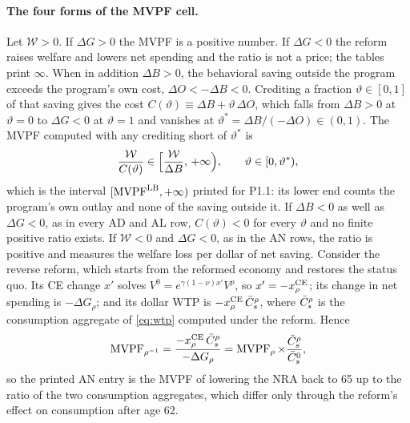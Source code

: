 \paragraph{The four forms of the MVPF cell.}
Let $\mathcal{W}>0$. If $\Delta G>0$ the MVPF is a positive number. If $\Delta G<0$ the reform raises welfare and lowers net spending and the ratio is not a price; the tables print $\infty$. When in addition $\Delta B>0$, the behavioral saving outside the program exceeds the program's own cost, $\Delta O<-\Delta B<0$. Crediting a fraction $\vartheta\in[0,1]$ of that saving gives the cost $C(\vartheta)\equiv\Delta B+\vartheta\,\Delta O$, which falls from $\Delta B>0$ at $\vartheta=0$ to $\Delta G<0$ at $\vartheta=1$ and vanishes at $\vartheta^{*}=\Delta B/(-\Delta O)\in(0,1)$. The MVPF computed with any crediting short of $\vartheta^{*}$ is
\begin{equation}\label{eq:app-lbset}
\frac{\mathcal{W}}{C(\vartheta)}\in\Bigl[\frac{\mathcal{W}}{\Delta B},\,+\infty\Bigr),\qquad \vartheta\in[0,\vartheta^{*}),
\end{equation}
which is the interval $[\operatorname{MVPF}^{\mathrm{LB}},+\infty)$ printed for P1.1: its lower end counts the program's own outlay and none of the saving outside it. If $\Delta B<0$ as well as $\Delta G<0$, as in every AD and AL row, $C(\vartheta)<0$ for every $\vartheta$ and no finite positive ratio exists.
If $\mathcal{W}<0$ and $\Delta G<0$, as in the AN rows, the ratio is positive and measures the welfare loss per dollar of net saving. Consider the reverse reform, which starts from the reformed economy and restores the status quo. Its CE change $x'$ solves $V^{0}=e^{\gamma(1-\nu)x'}V^{\rho}$, so $x'=-x^{\mathrm{CE}}_{\rho}$; its change in net spending is $-\Delta G_{\rho}$; and its dollar WTP is $-x^{\mathrm{CE}}_{\rho}\,\bar{C}_{s}^{\rho}$, where $\bar{C}_{s}^{\rho}$ is the consumption aggregate of \eqref{eq:wtp} computed under the reform. Hence
\begin{equation}\label{eq:app-reverse}
\operatorname{MVPF}_{\rho^{-1}}=\frac{-x^{\mathrm{CE}}_{\rho}\,\bar{C}_{s}^{\rho}}{-\Delta G_{\rho}}=\operatorname{MVPF}_{\rho}\times\frac{\bar{C}_{s}^{\rho}}{\bar{C}_{s}^{0}} ,
\end{equation}
so the printed AN entry is the MVPF of lowering the NRA back to 65 up to the ratio of the two consumption aggregates, which differ only through the reform's effect on consumption after age 62.
